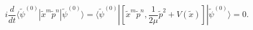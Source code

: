 \begin{equation}
\label{Eq:Virial}
i\frac{d}{dt} \langle \tilde \psi^{(0)}|\tilde  x^m \tilde p^n
|\tilde \psi^{(0)}\rangle
= \langle \tilde\psi^{(0)}|\left[ \tilde  x^m\tilde  p^n,
\frac{1}{2\mu} \tilde  p^2+V(\tilde  x )\right]
|\tilde\psi^{(0)}\rangle=0.
\end{equation}

